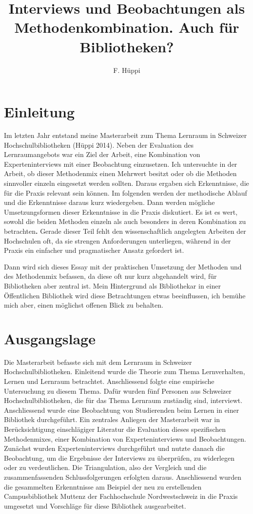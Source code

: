 \documentclass[a4paper,
fontsize=11pt,
oneside,
numbers=noperiodatend,
parskip=half-,
bibliography=totoc,
final
]{scrartcl}
\title{\LARGE{Interviews und Beobachtungen als Methodenkombination. Auch für
Bibliotheken?}} %
\author{F. Hüppi} %
\date{}
\begin{document}
\maketitle
\thispagestyle{fancyplain} 


\section*{Einleitung}\label{einleitung}

Im letzten Jahr entstand meine Masterarbeit zum Thema Lernraum in
Schweizer Hochschulbibliotheken (Hüppi 2014). Neben der Evaluation des
Lernraumangebots war ein Ziel der Arbeit, eine Kombination von
Experteninterviews mit einer Beobachtung einzusetzen. Ich untersuchte in
der Arbeit, ob dieser Methodenmix einen Mehrwert besitzt oder ob die
Methoden sinnvoller einzeln eingesetzt werden sollten. Daraus ergaben
sich Erkenntnisse, die für die Praxis relevant sein können. Im folgenden
werden der methodische Ablauf und die Erkenntnisse daraus kurz
wiedergeben. Dann werden mögliche Umsetzungsformen dieser Erkenntnisse
in die Praxis diskutiert. Es ist es wert, sowohl die beiden Methoden
einzeln als auch besonders in deren Kombination zu betrachten\textbf{.}
Gerade dieser Teil fehlt den wissenschaftlich angelegten Arbeiten der
Hochschulen oft, da sie strengen Anforderungen unterliegen, während in
der Praxis ein einfacher und pragmatischer Ansatz gefordert ist.

Dann wird sich dieses Essay mit der praktischen Umsetzung der Methoden
und des Methodenmix befassen, da diese oft nur kurz abgehandelt wird,
für Bibliotheken aber zentral ist. Mein Hintergrund als Bibliothekar in
einer Öffentlichen Bibliothek wird diese Betrachtungen etwas
beeinflussen, ich bemühe mich aber, einen möglichst offenen Blick zu
behalten.

\section*{Ausgangslage}\label{ausgangslage}

Die Masterarbeit befasste sich mit dem Lernraum in Schweizer
Hochschulbibliotheken. Einleitend wurde die Theorie zum Thema
Lernverhalten, Lernen und Lernraum betrachtet. Anschliessend folgte eine
empirische Untersuchung zu diesem Thema. Dafür wurden fünf Personen aus
Schweizer Hochschulbibliotheken, die für das Thema Lernraum zuständig
sind, interviewt. Anschliessend wurde eine Beobachtung von Studierenden
beim Lernen in einer Bibliothek durchgeführt. Ein zentrales Anliegen der
Masterarbeit war in Berücksichtigung einschlägiger Literatur die
Evaluation dieses spezifischen Methodenmixes, einer Kombination von
Experteninterviews und Beobachtungen. Zunächst wurden Experteninterviews
durchgeführt und nutzte danach die Beobachtung, um die Ergebnisse der
Interviews zu überprüfen, zu widerlegen oder zu verdeutlichen. Die
Triangulation, also der Vergleich und die zusammenfassenden
Schlussfolgerungen erfolgten daraus. Anschliessend wurden die
gesammelten Erkenntnisse am Beispiel der neu zu erstellenden
Campusbibliothek
Muttenz der
Fachhochschule Nordwestschweiz in die Praxis umgesetzt und Vorschläge
für diese Bibliothek ausgearbeitet.
\end{document}
